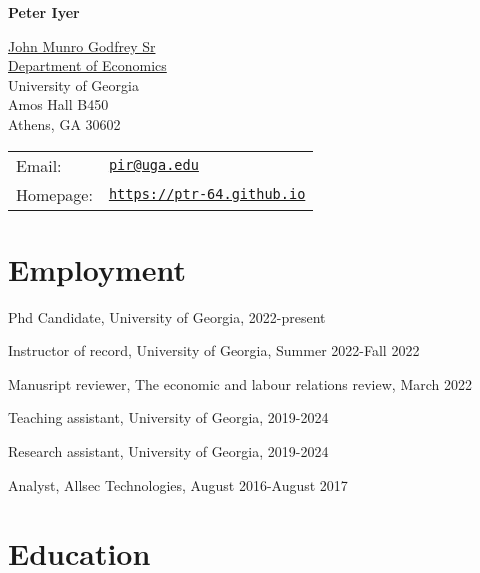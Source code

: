 \documentclass[letterpaper]{article}
\def\name{Peter Iyer}
\renewenvironment{itemize}{
  \begin{list}{}{
    \setlength{\leftmargin}{1.5em}
  }
}{
  \end{list}
}
\begin{document}

\centerline{\huge \bf \name}

\vspace{0.25in}

\begin{minipage}{0.45\linewidth}
  \href{}{John Munro Godfrey Sr \\Department of Economics} \\
  University of Georgia \\
  Amos Hall B450 \\
  Athens, GA 30602
\end{minipage}
\begin{minipage}{0.45\linewidth}
  \begin{tabular}{ll}
    Email:    & \href{mailto:pir@uga.edu}{\tt pir@uga.edu} \\
    Homepage: & \href{https://ptr-64.github.io/}{\tt https://ptr-64.github.io}
  \end{tabular}
\end{minipage}


\section*{Employment}
\begin{itemize}
    \item Phd Candidate, University of Georgia, 2022-present
      \item Instructor of record, University of Georgia, Summer 2022-Fall 2022
        \item Manusript reviewer, The economic and labour relations review, March 2022
          \item Teaching assistant, University of Georgia, 2019-2024
            \item Research assistant, University of Georgia, 2019-2024
              \item Analyst, Allsec Technologies, August 2016-August 2017
\end{itemize}


\section*{Education}
\end{document}
